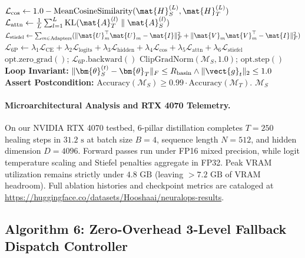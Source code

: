 \begin{algorithm}[H]
\begin{algorithmic}[1]
    \STATE $\mathcal{L}_{\text{cos}} \leftarrow 1.0 - \text{MeanCosineSimilarity}(\mat{H}_S^{(L)}, \mat{H}_T^{(L)})$
    \STATE $\mathcal{L}_{\text{attn}} \leftarrow \frac{1}{L} \sum_{l=1}^L \text{KL}(\mat{A}_T^{(l)} \parallel \mat{A}_S^{(l)})$
    \STATE $\mathcal{L}_{\text{stiefel}} \leftarrow \sum_{m \in \text{Adapters}} (\|\mat{U}_m^\top \mat{U}_m - \mat{I}\|_F^2 + \|\mat{V}_m \mat{V}_m^\top - \mat{I}\|_F^2)$
    \STATE $\mathcal{L}_{\text{6P}} \leftarrow \lambda_1 \mathcal{L}_{\text{CE}} + \lambda_2 \mathcal{L}_{\text{logits}} + \lambda_3 \mathcal{L}_{\text{hidden}} + \lambda_4 \mathcal{L}_{\text{cos}} + \lambda_5 \mathcal{L}_{\text{attn}} + \lambda_6 \mathcal{L}_{\text{stiefel}}$
    \STATE {}
    \STATE $\text{opt.zero\_grad}()$; $\mathcal{L}_{\text{6P}}.\text{backward}()$
    \STATE $\text{ClipGradNorm}(\mathcal{M}_S, 1.0)$; $\text{opt.step}()$
    \STATE \textbf{Loop Invariant:} $\|\bm{\theta}_S^{(t)} - \bm{\theta}_T\|_F \le R_{\text{basin}} \land \|\vect{g}_t\|_2 \le 1.0$
\ENDFOR
\STATE \textbf{Assert Postcondition:} $\text{Accuracy}(\mathcal{M}_S) \ge 0.99 \cdot \text{Accuracy}(\mathcal{M}_T)$.
\RETURN $\mathcal{M}_S$
\end{algorithmic}
\end{algorithm}

\paragraph{Microarchitectural Analysis and RTX 4070 Telemetry.}
On our NVIDIA RTX 4070 testbed, 6-pillar distillation completes $T=250$ healing steps in $31.2\text{ s}$ at batch size $B=4$, sequence length $N=512$, and hidden dimension $D=4096$. Forward passes run under FP16 mixed precision, while logit temperature scaling and Stiefel penalties aggregate in FP32. Peak VRAM utilization remains strictly under $4.8\text{ GB}$ (leaving $>7.2\text{ GB}$ of VRAM headroom). Full ablation histories and checkpoint metrics are cataloged at \url{https://huggingface.co/datasets/Hooshaai/neuralops-results}.

\subsection{Algorithm 6: Zero-Overhead 3-Level Fallback Dispatch Controller}
\label{subsec:alg_dispatch_controller}

